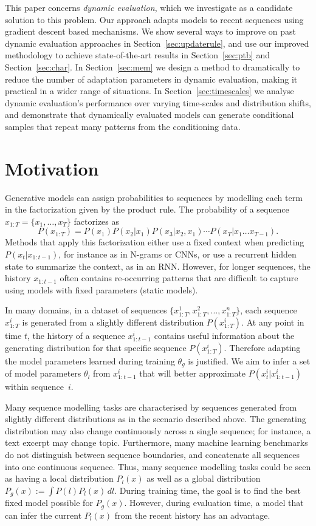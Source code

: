 \documentclass{article} %
\begin{document}
This paper concerns \emph{dynamic evaluation}, which we investigate as a candidate solution to this problem. Our approach adapts models to recent sequences using gradient descent based mechanisms. We show several ways to improve on past dynamic evaluation approaches in Section~\ref{sec:updaterule}, and use our improved methodology to achieve state-of-the-art results in Section~\ref{sec:ptb} and Section~\ref{sec:char}. In Section~\ref{sec:mem} we design a method to dramatically to reduce the number of adaptation parameters in dynamic evaluation, making it practical in a wider range of situations. In Section~\ref{sec:timescales} we analyse dynamic evaluation's performance over varying time-scales and distribution shifts, and demonstrate that dynamically evaluated models can generate conditional samples that repeat many patterns from the conditioning data. 

\section{Motivation}
Generative models can assign probabilities to sequences by modelling each term in the factorization given by the product rule. 
The probability of a sequence $x_{1:T} = \{x_1,\dots,x_T\}$ factorizes as
\begin{equation}
P(x_{1:T}) = P(x_1) P(x_2|x_1)P(x_3|x_2,x_1)\cdots P(x_T|x_1\dots x_{T-1}).
\end{equation} 
Methods that apply this factorization either use a fixed context when predicting $P(x_t|x_{1:t-1})$, for instance as in N-grams or CNNs, or use a recurrent hidden state to summarize the context, as in an RNN\@. However, for longer sequences, the history $x_{1:t-1}$ often contains re-occurring patterns that are difficult to capture using models with fixed parameters (static models).

In many domains, in a dataset of sequences $\{x^1_{1:T},x^2_{1:T},...,x^n_{1:T}\}$, each sequence $x^i_{1:T}$ is generated from a slightly different distribution $P(x^i_{1:T})$. At any point in time $t$, the history of a sequence $x^{i}_{1:t-1}$ contains useful information about the generating distribution for that specific sequence $P(x^i_{1:T})$.  Therefore adapting the model parameters learned during training $\theta_g$ is justified. We aim to infer a set of model parameters $\theta_l$ from $x^i_{1:t-1}$ that will better approximate $P(x^i_t|x^i_{1:t-1})$ within sequence~$i$.


Many sequence modelling tasks are characterised by sequences generated from slightly different distributions as in the scenario described above. The generating distribution may also change continuously across a single sequence; for instance, a text excerpt may change topic. Furthermore, many machine learning benchmarks do not distinguish between sequence boundaries, and concatenate all sequences into one continuous sequence. 
Thus, many sequence modelling tasks could be seen as having a local distribution $P_l(x)$ as well as a global distribution $P_g(x) := \int P(l) P_l(x) \, dl$. During training time, the goal is to find the best fixed model possible for $P_g(x)$. However, during evaluation time, a model that can infer the current $P_l(x)$ from the recent history has an advantage.
\end{document}

